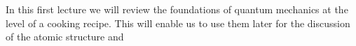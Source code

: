 In this first lecture we will review the foundations of quantum mechanics at the level of a cooking recipe. This will enable us to use them later for the discussion of the atomic structure and 